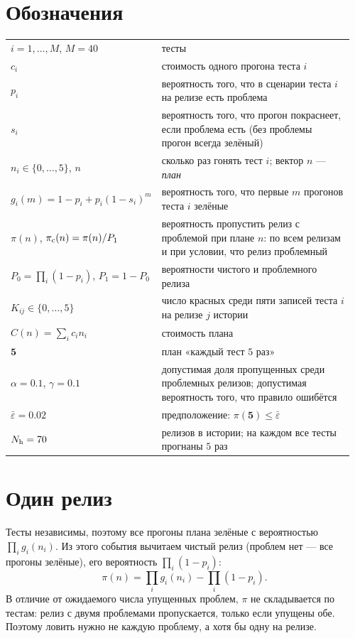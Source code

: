 \documentclass[11pt,a4paper]{article}
\theoremstyle{plain}
\theoremstyle{definition}
\begin{document}
\section*{Обозначения}

\begin{center}\small
\begin{tabular}{@{}p{0.36\linewidth}p{0.6\linewidth}@{}}
\toprule
$i=1,\dots,M$, $M=40$ & тесты \\
$c_i$ & стоимость одного прогона теста $i$ \\
$p_i$ & вероятность того, что в сценарии теста $i$ на релизе есть проблема \\
$s_i$ & вероятность того, что прогон покраснеет, если проблема есть (без проблемы прогон всегда зелёный) \\
$n_i\in\{0,\dots,5\}$, $n$ & сколько раз гонять тест $i$; вектор $n$ --- \emph{план} \\
$g_i(m)=1-p_i+p_i(1-s_i)^m$ & вероятность того, что первые $m$ прогонов теста $i$ зелёные \\
$\pi(n)$, $\pi_{\rm c}(n)=\pi(n)/P_1$ & вероятность пропустить релиз с проблемой при плане $n$: по всем релизам и при условии, что релиз проблемный \\
$P_0=\prod_i(1-p_i)$, $P_1=1-P_0$ & вероятности чистого и проблемного релиза \\
$K_{ij}\in\{0,\dots,5\}$ & число красных среди пяти записей теста $i$ на релизе $j$ истории \\
$C(n)=\sum_ic_in_i$ & стоимость плана \\
$\mathbf5$ & план «каждый тест $5$ раз» \\
$\alpha=0.1$, $\gamma=0.1$ & допустимая доля пропущенных среди проблемных релизов; допустимая вероятность того, что правило ошибётся \\
$\bar\varepsilon=0.02$ & предположение: $\pi(\mathbf5)\le\bar\varepsilon$ \\
$N_{\rm h}=70$ & релизов в истории; на каждом все тесты прогнаны $5$ раз \\
\bottomrule
\end{tabular}
\end{center}

\section{Один релиз}

Тесты независимы, поэтому все прогоны плана зелёные с вероятностью $\prod_ig_i(n_i)$. Из этого события вычитаем чистый релиз (проблем нет --- все прогоны зелёные), его вероятность $\prod_i(1-p_i)$:
\[
\boxed{\ \pi(n)=\prod_ig_i(n_i)-\prod_i(1-p_i).\ }
\]
В отличие от ожидаемого числа упущенных проблем, $\pi$ не складывается по тестам: релиз с двумя проблемами пропускается, только если упущены обе. Поэтому ловить нужно не каждую проблему, а хотя бы одну на релизе.
\end{document}
